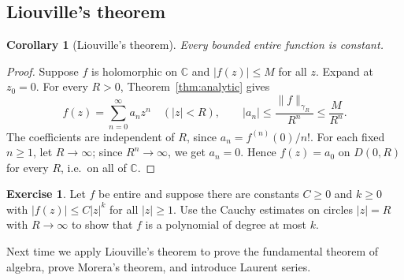 \documentclass[11pt]{article}
\theoremstyle{plain}
\newtheorem{corollary}[theorem]{Corollary}
\theoremstyle{definition}
\newtheorem{exercise}[theorem]{Exercise}
\theoremstyle{remark}
\numberwithin{equation}{section}
\newcommand{\C}{\mathbb{C}}
\newenvironment{lecturefigure}
 {\par\addvspace{0.25em}\begingroup\setlength{\parskip}{0pt}\centering}
 {\par\endgroup\addvspace{0.25em}}
\begin{document}
\subsection{Liouville's theorem}
\begin{corollary}[Liouville's theorem]\label{cor:liouville}
Every bounded entire function is constant.
\end{corollary}
\begin{proof}
Suppose $f$ is holomorphic on $\C$ and $|f(z)|\leq M$ for all $z$.
Expand at $z_0=0$. For every $R>0$, Theorem~\ref{thm:analytic} gives
\[
 f(z)=\sum_{n=0}^{\infty}a_n z^n\quad(|z|<R),\qquad
 |a_n|\leq\frac{\|f\|_{\gamma_R}}{R^n}\leq\frac{M}{R^n}.
\]
The coefficients are independent of $R$, since $a_n=f^{(n)}(0)/n!$.
For each fixed $n\geq1$, let $R\to\infty$; since $R^n\to\infty$, we get
$a_n=0$. Hence $f(z)=a_0$ on $D(0,R)$ for every $R$, i.e.\ on all of $\C$.
\end{proof}

\begin{lecturefigure}
\end{lecturefigure}

\begin{exercise}
Let $f$ be entire and suppose there are constants $C\geq0$ and $k\geq0$ with
$|f(z)|\leq C|z|^k$ for all $|z|\geq1$. Use the Cauchy estimates on
circles $|z|=R$ with $R\to\infty$ to show that $f$ is a polynomial of
degree at most $k$.
\end{exercise}

Next time we apply Liouville's theorem to prove the fundamental theorem
of algebra, prove Morera's theorem, and introduce Laurent series.
\end{document}
